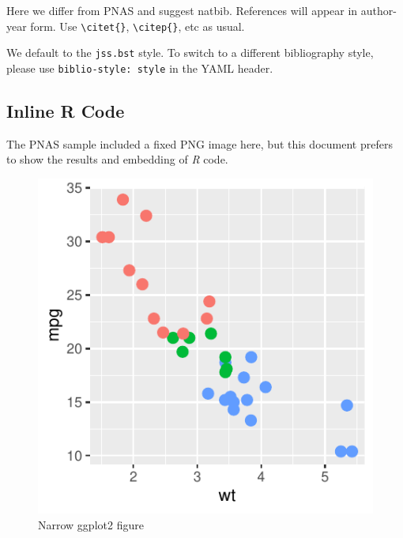 \documentclass[letterpaper,9pt,twocolumn,twoside,]{pinp}
\begin{document}
Here we differ from PNAS and suggest natbib. References will appear in
author-year form. Use \texttt{\textbackslash{}citet\{\}},
\texttt{\textbackslash{}citep\{\}}, etc as usual.

We default to the \texttt{jss.bst} style. To switch to a different
bibliography style, please use \texttt{biblio-style:\ style} in the YAML
header.

\hypertarget{inline-r-code}{%
\subsection{Inline R Code}\label{inline-r-code}}

The PNAS sample included a fixed PNG image here, but this document
prefers to show the results and embedding of \emph{R} code.

\begin{Shaded}
\begin{Highlighting}[]
\SpecialCharTok{+}
    \NormalTok{(}\NormalTok{, }\NormalTok{(}\SpecialCharTok{+}
    \NormalTok{(}\NormalTok{)}
\end{Highlighting}
\end{Shaded}

\begin{figure}

{\centering \includegraphics{template_files/figure-latex/figex-1} 

}

\caption{Narrow ggplot2 figure}\label{fig:figex}
\end{figure}
\end{document}
